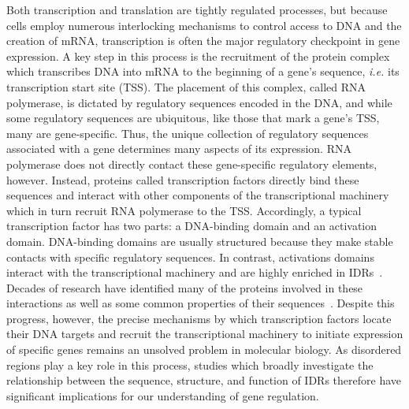 Both transcription and translation are tightly regulated processes, but because cells employ numerous interlocking mechanisms to control access to DNA and the creation of mRNA, transcription is often the major regulatory checkpoint in gene expression. A key step in this process is the recruitment of the protein complex which transcribes DNA into mRNA to the beginning of a gene's sequence, \textit{i.e.} its transcription start site (TSS). The placement of this complex, called RNA polymerase, is dictated by regulatory sequences encoded in the DNA, and while some regulatory sequences are ubiquitous, like those that mark a gene's TSS, many are gene-specific. Thus, the unique collection of regulatory sequences associated with a gene determines many aspects of its expression. RNA polymerase does not directly contact these gene-specific regulatory elements, however. Instead, proteins called transcription factors directly bind these sequences and interact with other components of the transcriptional machinery which in turn recruit RNA polymerase to the TSS. Accordingly, a typical transcription factor has two parts: a DNA-binding domain and an activation domain. DNA-binding domains are usually structured because they make stable contacts with specific regulatory sequences. In contrast, activations domains interact with the transcriptional machinery and are highly enriched in IDRs~\cite{Liu2006}. Decades of research have identified many of the proteins involved in these interactions as well as some common properties of their sequences~\cite{Ma1987, Sigler1988, Gerber1994, Arnold2018, Staller2018, Erijman2020, Sanborn2021}. Despite this progress, however, the precise mechanisms by which transcription factors locate their DNA targets and recruit the transcriptional machinery to initiate expression of specific genes remains an unsolved problem in molecular biology. As disordered regions play a key role in this process, studies which broadly investigate the relationship between the sequence, structure, and function of IDRs therefore have significant implications for our understanding of gene regulation.

